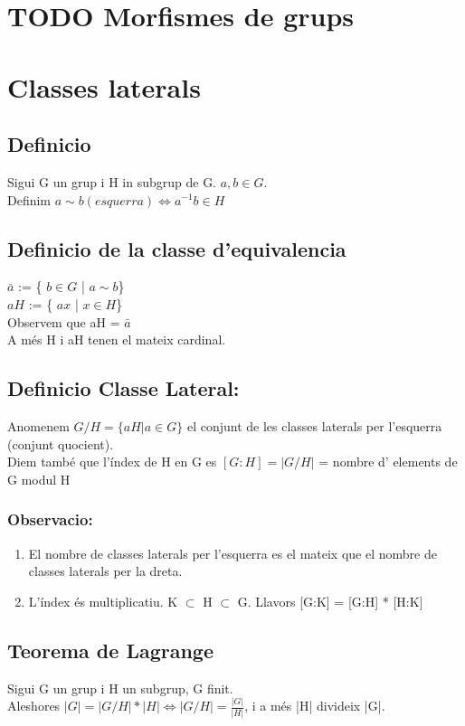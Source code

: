 \documentclass[11pt]{article}
\begin{document}
\section{{\bfseries\sffamily TODO} Morfismes de grups}
\label{sec:org1005c95}
\section{Classes laterals}
\label{sec:org1e25445}
\subsection{Definicio}
\label{sec:orgacf7c2a}
Sigui G un grup i H in subgrup de G. \(a,b \in G\). \\
Definim \(a \sim b (esquerra) \iff a^{-1}b \in H\)
\subsection{Definicio de la classe d'equivalencia}
\label{sec:org5a6b813}
\(\bar{a}\) := \{ \(b \in G\) | \(a \sim b\)\} \\
\(aH\) := \{ \(ax\) | \(x \in H\)\} \\
Observem que aH = \(\bar{a}\) \\
A més H i aH tenen el mateix cardinal.

\subsection{Definicio Classe Lateral:}
\label{sec:orgf656255}
Anomenem \(G/H = \{aH | a \in G\}\) el conjunt de les classes laterals per l'esquerra (conjunt quocient). \\
Diem també que l'índex de H en G es \([G:H] = |G/H|\) = nombre d' elements de G modul H

\subsubsection{Observacio:}
\label{sec:orgd9bfe68}
\begin{enumerate}
\item El nombre de classes laterals per l'esquerra es el mateix que el nombre de classes laterals per la dreta.
\item L'índex és multiplicatiu. K \(\subset\) H \(\subset\) G. Llavors [G:K] = [G:H] * [H:K]
\end{enumerate}

\subsection{Teorema de Lagrange}
\label{sec:orgd671b39}
Sigui G un grup i H un subgrup, G finit. \\
Aleshores \(|G| = |G/H| * |H| \iff |G/H| = \frac{|G|}{|H|}\), i a més |H| divideix |G|.
\end{document}
